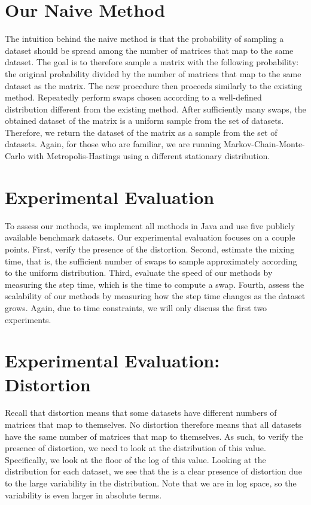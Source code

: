 \documentclass{article}
\begin{document}
\section*{Our Naive Method}

The intuition behind the naive method is that the probability of sampling a
dataset should be spread among the number of matrices that map to the same
dataset. The goal is to therefore sample a matrix with the following
probability: the original probability divided by the number of matrices that map
to the same dataset as the matrix. The new procedure then proceeds similarly to
the existing method. Repeatedly perform swaps chosen according to a well-defined
distribution different from the existing method. After sufficiently many swaps,
the obtained dataset of the matrix is a uniform sample from the set of datasets.
Therefore, we return the dataset of the matrix as a sample from the set of
datasets. Again, for those who are familiar, we are running
Markov-Chain-Monte-Carlo with Metropolis-Hastings using a different stationary
distribution.

\section*{Experimental Evaluation}

To assess our methods, we implement all methods in Java and use five publicly
available benchmark datasets. Our experimental evaluation focuses on a couple
points. First, verify the presence of the distortion. Second, estimate the
mixing time, that is, the sufficient number of swaps to sample approximately
according to the uniform distribution. Third, evaluate the speed of our methods
by measuring the step time, which is the time to compute a swap. Fourth, assess
the scalability of our methods by measuring how the step time changes as the
dataset grows. Again, due to time constraints, we will only discuss the first
two experiments.

\section*{Experimental Evaluation: Distortion}

Recall that distortion means that some datasets have different numbers of
matrices that map to themselves. No distortion therefore means that all datasets
have the same number of matrices that map to themselves. As such, to verify the
presence of distortion, we need to look at the distribution of this value.
Specifically, we look at the floor of the log of this value. Looking at the
distribution for each dataset, we see that the is a clear presence of distortion
due to the large variability in the distribution. Note that we are in log space,
so the variability is even larger in absolute terms.
\end{document}
